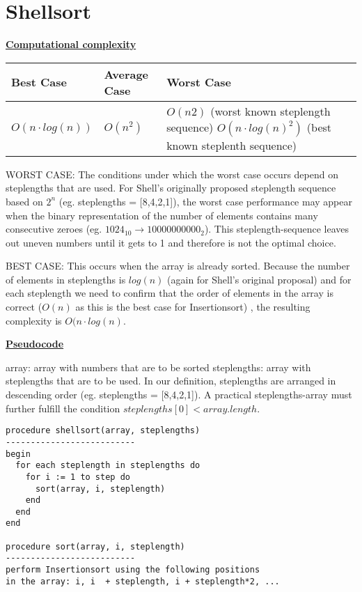 \documentclass[a4paper]{report}
\begin{document}
\chapter*{Shellsort}

\underline{\bf{Computational complexity}}

\begin{tabular}{|l|l|p{7cm} l |}
\hline
Best Case    & Average Case  &  Worst Case\\ \hline
$O(n\cdot log(n))$ & $O(n^2)$  &  $O(n2)$ (worst known steplength sequence) $O(n\cdot log(n)^2)$ (best known steplenth sequence) \\ \hline
\end{tabular}

WORST CASE: The conditions under which the worst case occurs depend on steplengths that are used. For Shell's originally proposed steplength sequence based on $2^n$ (eg. steplengths = [8,4,2,1]), the worst case performance may appear when the binary representation of the number of elements contains many consecutive zeroes (eg. $1024_{10} \rightarrow 10000000000_2$). This steplength-sequence leaves out uneven numbers until it gets to 1 and therefore is not the optimal choice.

BEST CASE: This occurs when the array is already sorted. Because the number of elements in steplengths is $log(n)$ (again for Shell's original proposal) and for each steplength we need to confirm that the order of elements in the array is correct ($O(n)$ as this is the best case for Insertionsort) , the resulting complexity is $O(n \cdot log(n)$.


\underline{\bf{Pseudocode}}

array: array with numbers that are to be sorted
steplengths: array with steplengths that are to be used. In our definition, steplengths are arranged in descending order (eg. steplengths = [8,4,2,1]). A practical steplengths-array must further fulfill the condition $steplengths[0] < array.length$. 


\begin{lstlisting}
procedure shellsort(array, steplengths)
--------------------------
begin
  for each steplength in steplengths do
    for i := 1 to step do
  	  sort(array, i, steplength)   
    end
  end
end

procedure sort(array, i, steplength)
--------------------------
perform Insertionsort using the following positions
in the array: i, i  + steplength, i + steplength*2, ...

\end{lstlisting}
\end{document}
